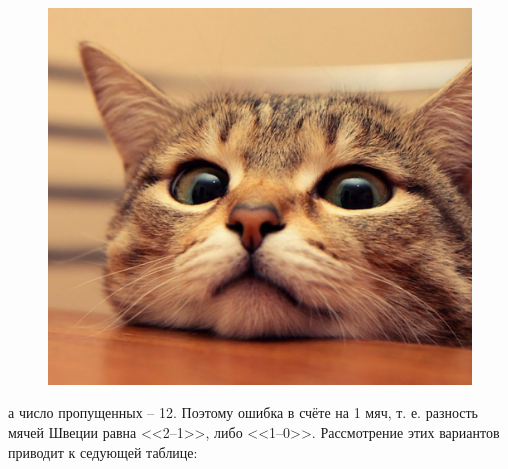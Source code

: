 \begin{multicols*}{2}
\begin{figure}[H]
\begin{minipage}[h]{0.49\linewidth}
			{\includegraphics[width=0.9\linewidth]{cat.jpg}}
			\caption{}
			\label{ris:image2} 
			
		\end{minipage}     
		    
	\end{figure}

	\begin{spacing}{0.9}
		\noindent а число пропущенных -- 12. Поэтому ошибка в счёте на 1 мяч, т. е. разность мячей Швеции равна <<2--1>>, либо <<1--0>>. Рассмотрение этих вариантов приводит к седующей таблице:
	\end{spacing}
	

\end{multicols*}
